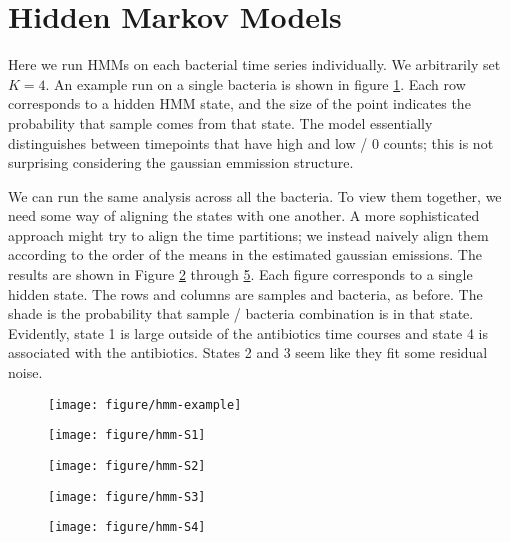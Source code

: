 \documentclass{article}
\begin{document}
\section{Hidden Markov Models}

Here we run HMMs on each bacterial time series individually. We arbitrarily set
$K = 4$. An example run on a single bacteria is shown in figure
\ref{fig:hmm-example}. Each row corresponds to a hidden HMM state, and the size
of the point indicates the probability that sample comes from that state. The
model essentially distinguishes between timepoints that have high and low / 0
counts; this is not surprising considering the gaussian emmission structure.

We can run the same analysis across all the bacteria. To view them together, we
need some way of aligning the states with one another. A more sophisticated
approach might try to align the time partitions; we instead naively align them
according to the order of the means in the estimated gaussian emissions. The
results are shown in Figure \ref{fig:hmm-S1} through \ref{fig:hmm-S4}. Each
figure corresponds to a single hidden state. The rows and columns are samples
and bacteria, as before. The shade is the probability that sample / bacteria
combination is in that state. Evidently, state 1 is large outside of the
antibiotics time courses and state 4 is associated with the antibiotics. States
2 and 3 seem like they fit some residual noise.

\begin{figure}[ht]
  \centering
  \texttt{[image: figure/hmm-example]}
  \caption{\label{fig:hmm-example} }
\end{figure}

\begin{figure}[ht]
  \centering
  \texttt{[image: figure/hmm-S1]}
  \caption{\label{fig:hmm-S1} }
\end{figure}

\begin{figure}[ht]
  \centering
  \texttt{[image: figure/hmm-S2]}
  \caption{\label{fig:hmm-S2} }
\end{figure}

\begin{figure}[ht]
  \centering
  \texttt{[image: figure/hmm-S3]}
  \caption{\label{fig:hmm-S3} }
\end{figure}

\begin{figure}[ht]
  \centering
  \texttt{[image: figure/hmm-S4]}
  \caption{\label{fig:hmm-S4} }
\end{figure}



\end{document}

